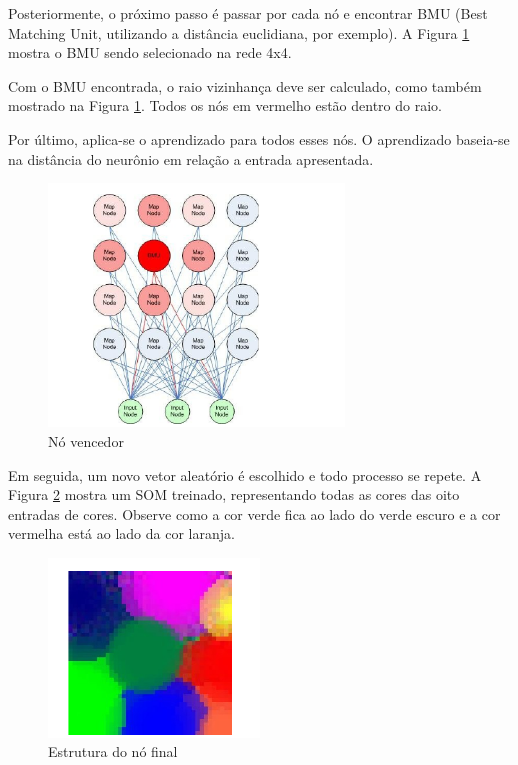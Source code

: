 Posteriormente, o próximo passo é passar por cada nó e encontrar BMU (Best Matching Unit, utilizando a distância euclidiana, por exemplo). A Figura \ref{fig:bmu-node} mostra o BMU sendo selecionado na rede 4x4.

Com o BMU encontrada, o raio vizinhança deve ser calculado, como também mostrado na Figura \ref{fig:bmu-node}. Todos os nós em vermelho estão dentro do raio. 

Por último, aplica-se o aprendizado para todos esses nós. O aprendizado baseia-se na distância do neurônio em relação a entrada apresentada.

\begin{figure}[ht]
\centering
\includegraphics[width=0.7\textwidth]{imgs/node-bmu.png}
\caption{Nó vencedor}
\label{fig:bmu-node}
\end{figure}

Em seguida, um novo vetor aleatório é escolhido e todo processo se repete. A Figura \ref{fig:final-node} mostra um SOM treinado, representando todas as cores das oito entradas de cores. Observe como a cor verde fica ao lado do verde escuro e a cor vermelha está ao lado da cor laranja.

\begin{figure}[ht]
\centering
\includegraphics[width=0.5\textwidth]{imgs/final-node.png}
\caption{Estrutura do nó final}
\label{fig:final-node}
\end{figure}